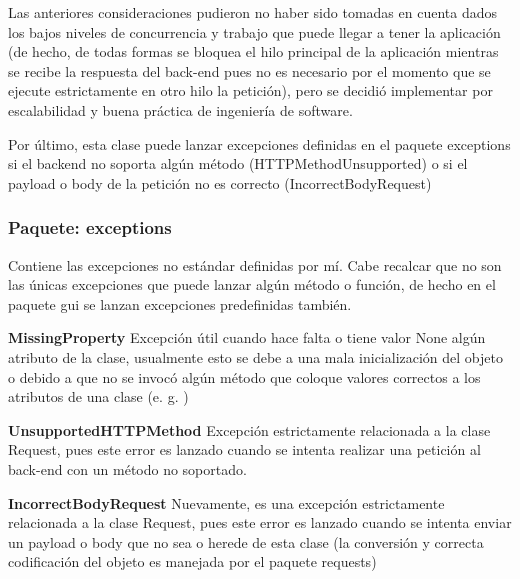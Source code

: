 Las anteriores consideraciones pudieron no haber sido tomadas en cuenta dados los bajos niveles de concurrencia y trabajo que puede llegar a tener la aplicación (de hecho, de todas formas se bloquea el hilo principal de la aplicación mientras se recibe la respuesta del back-end pues no es necesario por el momento que se ejecute estrictamente en otro hilo la petición), pero se decidió implementar por escalabilidad y buena práctica de ingeniería de software.

Por último, esta clase puede lanzar excepciones definidas en el paquete exceptions si el backend no soporta algún método (HTTPMethodUnsupported) o si el payload o body de la petición no es correcto (IncorrectBodyRequest)

\subsubsection{Paquete: exceptions}
Contiene las excepciones no estándar definidas por mí. Cabe recalcar que no son las únicas excepciones que puede lanzar algún método o función, de hecho en el paquete gui se lanzan excepciones predefinidas también.

\textbf{MissingProperty}\newline
Excepción útil cuando hace falta o tiene valor None algún atributo de la clase, usualmente esto se debe a una mala inicialización del objeto o debido a que no se invocó algún método que coloque valores correctos a los atributos de una clase (e. g. )

\textbf{UnsupportedHTTPMethod}\newline
Excepción estrictamente relacionada a la clase Request, pues este error es lanzado cuando se intenta realizar una petición al back-end con un método no soportado.

\textbf{IncorrectBodyRequest}\newline
Nuevamente, es una excepción estrictamente relacionada a la clase Request, pues este error es lanzado cuando se intenta enviar un payload o body que no sea  o herede de esta clase (la conversión y correcta codificación del objeto es manejada por el paquete requests)